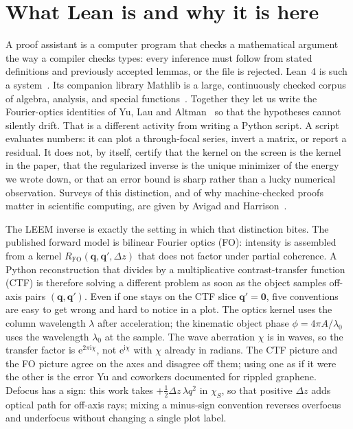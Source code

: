 
\section{What Lean is and why it is here}
\label{sec:what-lean-is}

A proof assistant is a computer program that checks a mathematical
argument the way a compiler checks types: every inference must follow
from stated definitions and previously accepted lemmas, or the file is
rejected.
Lean~4 is such a system~\cite{deMoura2021}.
Its companion library Mathlib is a large, continuously checked corpus
of algebra, analysis, and special functions~\cite{mathlib2020}.
Together they let us write the Fourier-optics identities of Yu, Lau and
Altman~\cite{Yu2019} so that the hypotheses cannot silently drift.
That is a different activity from writing a Python script.
A script evaluates numbers: it can plot a through-focal series, invert
a matrix, or report a residual.
It does not, by itself, certify that the kernel on the screen is the
kernel in the paper, that the regularized inverse is the unique
minimizer of the energy we wrote down, or that an error bound is sharp
rather than a lucky numerical observation.
Surveys of this distinction, and of why machine-checked proofs matter
in scientific computing, are given by Avigad and
Harrison~\cite{Avigad2014}.

The LEEM inverse is exactly the setting in which that distinction
bites.
The published forward model is bilinear Fourier optics (FO): intensity
is assembled from a kernel $R_{\mathrm{FO}}(\mathbf{q},\mathbf{q}',\Delta z)$
that does not factor under partial coherence.
A Python reconstruction that divides by a multiplicative
contrast-transfer function (CTF) is therefore solving a different
problem as soon as the object samples off-axis pairs
$(\mathbf{q},\mathbf{q}')$.
Even if one stays on the CTF slice $\mathbf{q}'=\mathbf{0}$, five
conventions are easy to get wrong and hard to notice in a plot.
The optics kernel uses the column wavelength $\lambda$ after
acceleration; the kinematic object phase $\phi=4\pi A/\lambda_0$ uses
the wavelength $\lambda_0$ at the sample.
The wave aberration $\chi$ is in waves, so the transfer factor is
$\mathrm{e}^{2\pi\mathrm{i}\chi}$, not $\mathrm{e}^{\mathrm{i}\chi}$ with
$\chi$ already in radians.
The CTF picture and the FO picture agree on the axes and disagree off
them; using one as if it were the other is the error Yu and
coworkers documented for rippled graphene.
Defocus has a sign: this work takes
$+\tfrac12\Delta z\,\lambda q^2$ in $\chi_S$, so that positive
$\Delta z$ adds optical path for off-axis rays; mixing a minus-sign
convention reverses overfocus and underfocus without changing a single
plot label.

